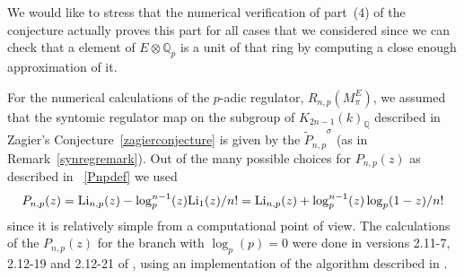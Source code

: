 \documentclass{amsart}
\begin{document}
We would like to stress that the numerical verification of part~(4) of the conjecture actually proves
this part for all cases that we considered since we can check that a element of $ E{\otimes}{{\mathbb Q_p}} $ is a unit
of that ring by computing a close enough approximation of it.

For the numerical calculations of the {$p$-adic{\futurelet{}}} regulator, $ R_{n,p}(M_\pi^E) $,
 we assumed that the syntomic regulator map on the subgroup of $ {K_{2n-1}(k)_{\mathbb Q}}$ described in Zagier's
Conjecture~\ref{zagierconjecture} 
is given by the $ {{\widetilde P}_{n,p}}^{\sigma} $ (as in Remark~\ref{synregremark}).
Out of the many possible choices for $ {P_{n,p}}(z) $ as described in ~\eqref{Pnpdef}
we used
\[
{P_{n,p}}(z) = {\textup{Li}}_{n,p}(z) - \log_p^{n-1}(z) {\textup{Li}}_1(z) / n!
            = {\textup{Li}}_{n,p}(z) + \log_p^{n-1}(z) \log_p(1-z) / n!
\]
since it is relatively simple from a computational point of view.  The calculations of the $ {P_{n,p}}(z) $
for the branch with $ \log_p(p)=0 $
were done in versions 2.11-7, 2.12-19 and 2.12-21 of \cite{magma},
using an implementation of the algorithm described in \cite{BdJ06}. 
\end{document}
